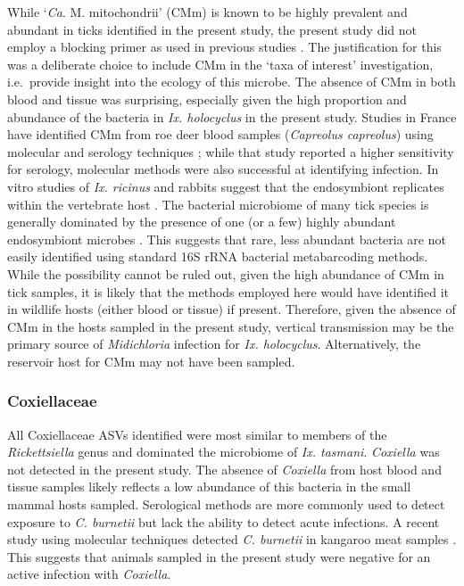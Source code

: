 \documentclass[a4paper, nobind]{templates/ociamthesis}
\begin{document}
While `\emph{Ca}. M. mitochondrii' (CMm) is known to be highly prevalent and abundant in ticks identified in the present study, the present study did not employ a blocking primer as used in previous studies \autocite{goftonInhibitionEndosymbiontCandidatus2015,eganBacterialCommunityProfiling2020}.
The justification for this was a deliberate choice to include CMm in the `taxa of interest' investigation, i.e.~provide insight into the ecology of this microbe.
The absence of CMm in both blood and tissue was surprising, especially given the high proportion and abundance of the bacteria in \emph{Ix. holocyclus} in the present study.
Studies in France have identified CMm from roe deer blood samples (\emph{Capreolus capreolus}) using molecular and serology techniques \autocite{serraMolecularSerologicalEvidence2018}; while that study reported a higher sensitivity for serology, molecular methods were also successful at identifying infection.
In vitro studies of \emph{Ix. ricinus} and rabbits suggest that the endosymbiont replicates within the vertebrate host \autocite{cafisoMidichloriaMitochondriiEndosymbiont2019}.
The bacterial microbiome of many tick species is generally dominated by the presence of one (or a few) highly abundant endosymbiont microbes \autocite{claytonCharacterizationManipulationBacterial2015,goftonInhibitionEndosymbiontCandidatus2015,varela-stokesMicrobialCommunitiesNorth2017}.
This suggests that rare, less abundant bacteria are not easily identified using standard 16S rRNA bacterial metabarcoding methods.
While the possibility cannot be ruled out, given the high abundance of CMm in tick samples, it is likely that the methods employed here would have identified it in wildlife hosts (either blood or tissue) if present.
Therefore, given the absence of CMm in the hosts sampled in the present study, vertical transmission may be the primary source of \emph{Midichloria} infection for \emph{Ix. holocyclus}. Alternatively, the reservoir host for CMm may not have been sampled.

\hypertarget{coxiellaceae-1}{%
\subsubsection{Coxiellaceae}\label{coxiellaceae-1}}

All Coxiellaceae ASVs identified were most similar to members of the \emph{Rickettsiella} genus and dominated the microbiome of \emph{Ix. tasmani}.
\emph{Coxiella} was not detected in the present study.
The absence of \emph{Coxiella} from host blood and tissue samples likely reflects a low abundance of this bacteria in the small mammal hosts sampled.
Serological methods are more commonly used to detect exposure to \emph{C. burnetii} \autocite{cooperSerologicalEvidenceCoxiella2012} but lack the ability to detect acute infections.
A recent study using molecular techniques detected \emph{C. burnetii} in kangaroo meat samples \autocite{shapiroMolecularDetectionCoxiella2020}. This suggests that animals sampled in the present study were negative for an active infection with \emph{Coxiella}.
\end{document}
